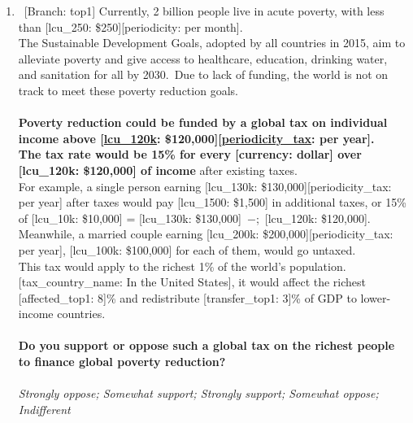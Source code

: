 \begin{enumerate}[resume]
\item ~[Branch: top1] \label{q:top1_tax_support} Currently, 2 billion people live in acute poverty, with less than [lcu\_250: \$250][periodicity: per month].\\The Sustainable Development Goals, adopted by all countries in 2015, aim to alleviate poverty and give access to healthcare, education, drinking water, and sanitation for all by 2030.~Due to lack of funding, the world is not on track to meet these poverty reduction goals.\\\\\textbf{Poverty reduction could be funded by a global tax on individual income above [\hyperlink{tab_features}{lcu\_120k}: \$120,000][\hyperlink{tab_features}{periodicity\_tax}: per year].~\\The tax rate would be 15\% for every [currency: dollar] over [lcu\_120k: \$120,000] of income} after existing taxes.~\\For example, a single person earning [lcu\_130k: \$130,000][periodicity\_tax: per year] after taxes would pay [lcu\_1500: \$1,500] in additional taxes, or 15\% of [lcu\_10k: \$10,000] = [lcu\_130k: \$130,000]~$-$;~[lcu\_120k: \$120,000]. Meanwhile, a married couple earning [lcu\_200k: \$200,000][periodicity\_tax: per year], [lcu\_100k: \$100,000] for each of them, would go untaxed.\\This tax would apply to the richest 1\% of the world's population. [tax\_country\_name: In the United States], it would affect the richest [affected\_top1: 8]\% and redistribute [transfer\_top1: 3]\% of GDP to lower-income countries.\\\\\textbf{Do you support or oppose such a global tax on the richest people to finance global poverty reduction?}\\ 
  \\ \textit{Strongly oppose; Somewhat support; Strongly support; Somewhat oppose; Indifferent}


\end{enumerate}
